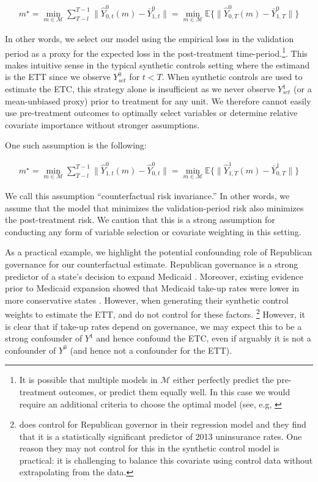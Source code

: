 \begin{align*}
m^\star = \min_{m \in \mathcal{M}}\sum_{T - l}^{T-1}\|\hat{Y}^0_{0, t}(m) - \bar{Y}^0_{1, t}\| = \min_{m \in \mathcal{M}}\mathbb{E}\{\|\hat{Y}^0_{0, T}(m) - \bar{Y}^0_{1, T}\|\}
\end{align*}

In other words, we select our model using the empirical loss in the validation period as a proxy for the expected loss in the post-treatment time-period.\footnote{It is possible that multiple models in $\mathcal{M}$ either perfectly predict the pre-treatment outcomes, or predict them equally well. In this case we would require an additional criteria to choose the optimal model (see, e.g, \cite{becker2017cross}}. This makes intuitive sense in the typical synthetic controls setting where the estimand is the ETT since we observe $Y^0_{sct}$ for $t < T$. When synthetic controls are used to estimate the ETC, this strategy alone is insufficient as we never observe $Y^1_{sct}$ (or a mean-unbiased proxy) prior to treatment for any unit. We therefore cannot easily use pre-treatment outcomes to optimally select variables or determine relative covariate importance without stronger assumptions.

One such assumption is the following:

\begin{align*}\label{assumption:second}
m^\star = \min_{m \in \mathcal{M}}\sum_{T - l}^{T-1}\|\hat{Y}^0_{1, t}(m) - \hat{Y}^0_{0, t}\| = \min_{m \in \mathcal{M}}\mathbb{E}\{\|\hat{Y}^1_{1, T}(m) - \bar{Y}^1_{0, T}\|\}
\end{align*}

We call this assumption ``counterfactual risk invariance.'' In other words, we assume that the model that minimizes the validation-period risk also minimizes the post-treatment risk. We caution that this is a strong assumption for conducting any form of variable selection or covariate weighting in this setting. 

As a practical example, we highlight the potential confounding role of Republican governance for our counterfactual estimate. Republican governance is a strong predictor of a state's decision to expand Medicaid \cite{courtemanche2017early}. Moreover, existing evidence prior to Medicaid expansion showed that Medicaid take-up rates were lower in more conservative states \cite{sommers2012understanding}. However, when generating their synthetic control weights to estimate the ETT, \cite{courtemanche2017early} and \cite{kaestner2017effects} do not control for these factors. \footnote{\cite{courtemanche2017early} does control for Republican governor in their regression model and they find that it is a statistically significant predictor of 2013 uninsurance rates. One reason they may not control for this in the synthetic control model is practical: it is challenging to balance this covariate using control data without extrapolating from the data.} However, it is clear that if take-up rates depend on governance, we may expect this to be a strong confounder of $Y^1$ and hence confound the ETC, even if arguably it is not a confounder of $Y^0$ (and hence not a confounder for the ETT).


